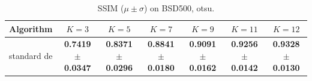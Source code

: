 \begin{table}[htbp]
\centering
\caption{SSIM ($\mu \pm \sigma$) on BSD500, otsu.}
\label{tab:exp1-otsu-ssim}
\begin{tabular}{lcccccc}
\toprule
Algorithm & $K=3$ & $K=5$ & $K=7$ & $K=9$ & $K=11$ & $K=12$ \\
\midrule
standard de & \textbf{0.7419 $\pm$ 0.0347} & \textbf{0.8371 $\pm$ 0.0296} & \textbf{0.8841 $\pm$ 0.0180} & \textbf{0.9091 $\pm$ 0.0162} & \textbf{0.9256 $\pm$ 0.0142} & \textbf{0.9328 $\pm$ 0.0130} \\
\bottomrule
\end{tabular}
\end{table}